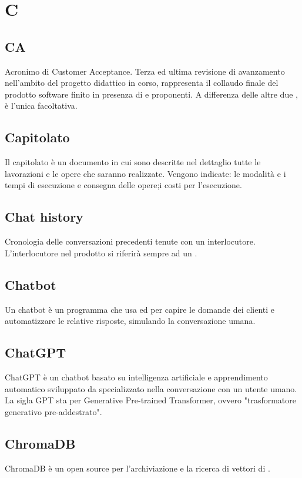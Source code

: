 \chapter{C}

\section{CA}\label{sec:Customer Acceptance}
Acronimo di Customer Acceptance. Terza ed ultima revisione di avanzamento nell'ambito del progetto didattico in corso, rappresenta il collaudo finale del prodotto software finito in presenza di  e proponenti. A differenza delle altre due , è l'unica facoltativa.

\section{Capitolato}\label{sec:Capitolati}
Il capitolato è un documento in cui sono descritte nel dettaglio tutte le lavorazioni e le opere che saranno realizzate. Vengono indicate: le modalità e i tempi di esecuzione e consegna delle opere;i costi per l'esecuzione.

\section{Chat history}
Cronologia delle conversazioni precedenti tenute con un interlocutore. L'interlocutore nel prodotto si riferirà sempre ad un .

\section{Chatbot}
Un chatbot è un programma che usa  ed  per capire le domande dei clienti e automatizzare le relative risposte, simulando la conversazione umana.

\section{ChatGPT}
ChatGPT è un chatbot basato su intelligenza artificiale e apprendimento automatico sviluppato da  specializzato nella conversazione con un utente umano. La sigla GPT sta per Generative Pre-trained Transformer, ovvero "trasformatore generativo pre-addestrato". 

\section{ChromaDB}\label{sec:Chroma}
ChromaDB è un  open source per l'archiviazione e la ricerca di vettori di .

